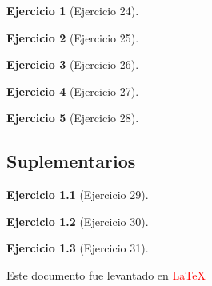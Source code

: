\documentclass[a4paper,11pt, openany]{book}
\newtheorem{ejer}{Ejercicio}[section]
\begin{document}
\begin{ejer}[Ejercicio 24]
 
\end{ejer}
 
\begin{ejer}[Ejercicio 25]
 
\end{ejer}
 
\begin{ejer}[Ejercicio 26]
 
\end{ejer}
 
\begin{ejer}[Ejercicio 27]
 
\end{ejer}
 
\begin{ejer}[Ejercicio 28]
 
\end{ejer}
 
 
\textcolor{brass}{\chapter{Suplementarios}}
 
\begin{ejer}[Ejercicio 29]
 
\end{ejer}
 
\begin{ejer}[Ejercicio 30]
 
\end{ejer}
 
\begin{ejer}[Ejercicio 31]
 
\end{ejer}
 
Este documento fue levantado en \textcolor{red}{\LaTeX}
 
\end{document}
